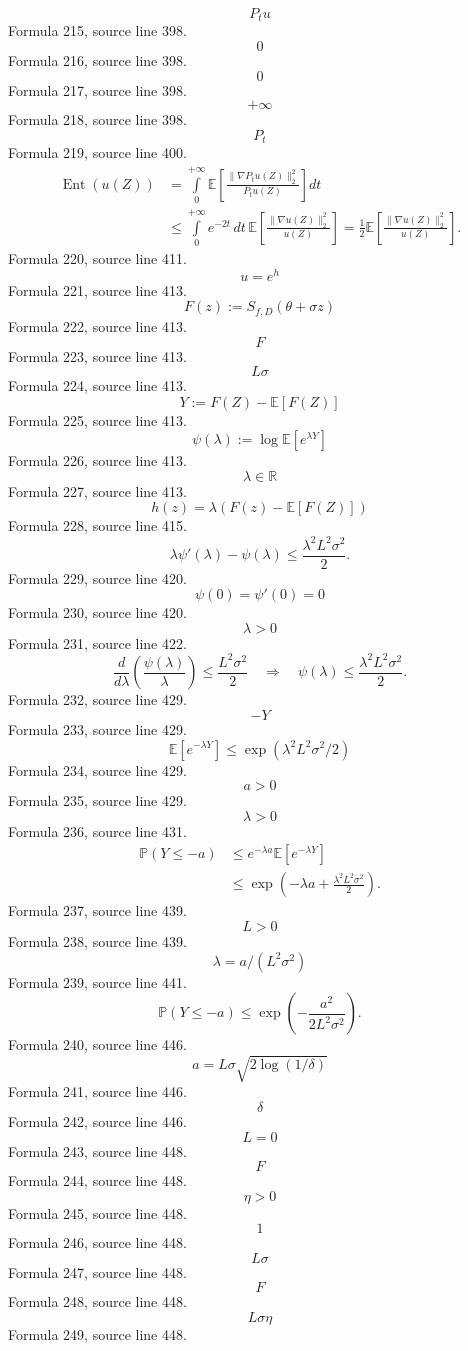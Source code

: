\documentclass{ctexart}
\begin{document}
\[P_tu\]
Formula 215, source line 398.
\[0\]
Formula 216, source line 398.
\[0\]
Formula 217, source line 398.
\[+\infty\]
Formula 218, source line 398.
\[P_t\]
Formula 219, source line 400.
\[
\begin{aligned}
\operatorname{Ent}(u(Z))
&=\int\limits_0^{+\infty}
\mathbb E\left[\frac{\|\nabla P_tu(Z)\|_2^2}{P_tu(Z)}\right]dt\\
&\leq\int\limits_0^{+\infty}e^{-2t}\,dt\,
\mathbb E\left[\frac{\|\nabla u(Z)\|_2^2}{u(Z)}\right]
=\frac12\mathbb E\left[\frac{\|\nabla u(Z)\|_2^2}{u(Z)}\right].
\end{aligned}
\]
Formula 220, source line 411.
\[u=e^h\]
Formula 221, source line 413.
\[F(z):=S_{f,D}(\theta+\sigma z)\]
Formula 222, source line 413.
\[F\]
Formula 223, source line 413.
\[L\sigma\]
Formula 224, source line 413.
\[Y:=F(Z)-\mathbb E[F(Z)]\]
Formula 225, source line 413.
\[\psi(\lambda):=\log\mathbb E[e^{\lambda Y}]\]
Formula 226, source line 413.
\[\lambda\in\mathbb R\]
Formula 227, source line 413.
\[h(z)=\lambda(F(z)-\mathbb E[F(Z)])\]
Formula 228, source line 415.
\[
\lambda\psi'(\lambda)-\psi(\lambda)
\leq\frac{\lambda^2L^2\sigma^2}{2}.
\]
Formula 229, source line 420.
\[\psi(0)=\psi'(0)=0\]
Formula 230, source line 420.
\[\lambda>0\]
Formula 231, source line 422.
\[
\frac{d}{d\lambda}\left(\frac{\psi(\lambda)}{\lambda}\right)
\leq\frac{L^2\sigma^2}{2}
\quad\Longrightarrow\quad
\psi(\lambda)\leq\frac{\lambda^2L^2\sigma^2}{2}.
\]
Formula 232, source line 429.
\[-Y\]
Formula 233, source line 429.
\[\mathbb E[e^{-\lambda Y}]\leq\exp(\lambda^2L^2\sigma^2/2)\]
Formula 234, source line 429.
\[a>0\]
Formula 235, source line 429.
\[\lambda>0\]
Formula 236, source line 431.
\[
\begin{aligned}
\mathbb P(Y\leq-a)
&\leq e^{-\lambda a}\mathbb E[e^{-\lambda Y}]\\
&\leq\exp\left(-\lambda a+\frac{\lambda^2L^2\sigma^2}{2}\right).
\end{aligned}
\]
Formula 237, source line 439.
\[L>0\]
Formula 238, source line 439.
\[\lambda=a/(L^2\sigma^2)\]
Formula 239, source line 441.
\[
\mathbb P(Y\leq-a)
\leq\exp\left(-\frac{a^2}{2L^2\sigma^2}\right).
\]
Formula 240, source line 446.
\[a=L\sigma\sqrt{2\log(1/\delta)}\]
Formula 241, source line 446.
\[\delta\]
Formula 242, source line 446.
\[L=0\]
Formula 243, source line 448.
\[F\]
Formula 244, source line 448.
\[\eta>0\]
Formula 245, source line 448.
\[1\]
Formula 246, source line 448.
\[L\sigma\]
Formula 247, source line 448.
\[F\]
Formula 248, source line 448.
\[L\sigma\eta\]
Formula 249, source line 448.
\end{document}
